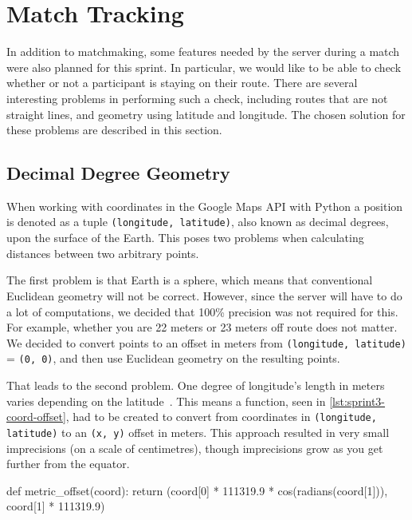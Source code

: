 \section{Match Tracking}
\label{sec:sprint3-gameserver}

In addition to matchmaking, some features needed by the server during a match were also planned for this sprint. In particular, we would like to be able to check whether or not a participant is staying on their route. There are several interesting problems in performing such a check, including routes that are not straight lines, and geometry using latitude and longitude. The chosen solution for these problems are described in this section.

\subsection{Decimal Degree Geometry}
When working with coordinates in the Google Maps \ac{API} with Python a position is denoted as a tuple \texttt{(longitude, latitude)}, also known as decimal degrees, upon the surface of the Earth. This poses two problems when calculating distances between two arbitrary points.

The first problem is that Earth is a sphere, which means that conventional Euclidean geometry will not be correct. However, since the server will have to do a lot of computations, we decided that 100\% precision was not required for this. For example, whether you are 22 meters or 23 meters off route does not matter. We decided to convert points to an offset in meters from \texttt{(longitude, latitude)} = \texttt{(0, 0)}, and then use Euclidean geometry on the resulting points.

That leads to the second problem. One degree of longitude's length in meters varies depending on the latitude~\citep{wikidecimaldegrees}. This means a function, seen in \autoref{lst:sprint3-coord-offset}, had to be created to convert from coordinates in \texttt{(longitude, latitude)} to an \texttt{(x, y)} offset in meters. This approach resulted in very small imprecisions (on a scale of centimetres), though imprecisions grow as you get further from the equator.

\begin{code}[label={lst:sprint3-coord-offset}, caption={Convert Decimal Degrees to Offset in Meters}, language={Python}]
def metric_offset(coord):
	return (coord[0] * 111319.9 * cos(radians(coord[1])), 
	        coord[1] * 111319.9)
\end{code}

